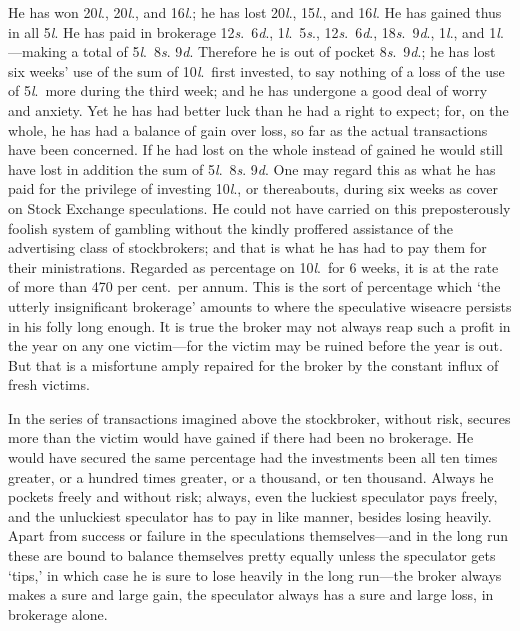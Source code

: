 \documentclass[letterpaper,12pt,oneside,openany]{memoir}
\begin{document}
He has won 20\textit{l}., 20\textit{l}., and 16\textit{l}.; he has lost 20\textit{l}.,
15\textit{l}., and 16\textit{l}. He has gained thus in all 5\textit{l}. He has
paid in brokerage 12\textit{s}.\ 6\textit{d}., 1\textit{l}.\ 5\textit{s}., 12\textit{s}.\ 6\textit{d}., 18\textit{s}.\ 9\textit{d}.,
1\textit{l}., and 1\textit{l}.---making a total of 5\textit{l}.\ 8\textit{s}. 9\textit{d}. Therefore he
is out of pocket 8\textit{s}.\ 9\textit{d}.; he has lost six weeks' use of
the sum of 10\textit{l}.\ first invested, to say nothing of a loss of
the use of 5\textit{l}.\ more during the third week; and he has
undergone a good deal of worry and anxiety. Yet he
has had better luck than he had a right to expect; for,
on the whole, he has had a balance of gain over loss, so
far as the actual transactions have been concerned. If
he had lost on the whole instead of gained he would
still have lost in addition the sum of 5\textit{l}.\ 8\textit{s}. 9\textit{d}. One
may regard this as what he has paid for the privilege
of investing 10\textit{l}., or thereabouts, during six weeks as
cover on Stock Exchange speculations. He could not
have carried on this preposterously foolish system of
gambling without the kindly proffered assistance of the
advertising class of stockbrokers; and that is what he
has had to pay them for their ministrations. Regarded
as percentage on 10\textit{l}.\ for 6 weeks, it is at the rate of
more than 470 per cent.\ per annum. This is the sort of
percentage which `the utterly insignificant brokerage'
amounts to where the speculative wiseacre persists in
his folly long enough. It is true the broker may not
always reap such a profit in the year on any one
victim---for the victim may be ruined before the year is
out. But that is a misfortune amply repaired for the
broker by the constant influx of fresh victims.

In the series of transactions imagined above the
stockbroker, without risk, secures more than the victim
would have gained if there had been no brokerage.
He would have secured the same percentage had the
investments been all ten times greater, or a hundred
times greater, or a thousand, or ten thousand. Always
he pockets freely and without risk; always, even the
luckiest speculator pays freely, and the unluckiest speculator
has to pay in like manner, besides losing heavily.
Apart from success or failure in the speculations themselves---and
in the long run these are bound to balance
themselves pretty equally unless the speculator gets
`tips,' in which case he is sure to lose heavily in the
long run---the broker always makes a sure and large
gain, the speculator always has a sure and large loss, in
brokerage alone.
\end{document}
